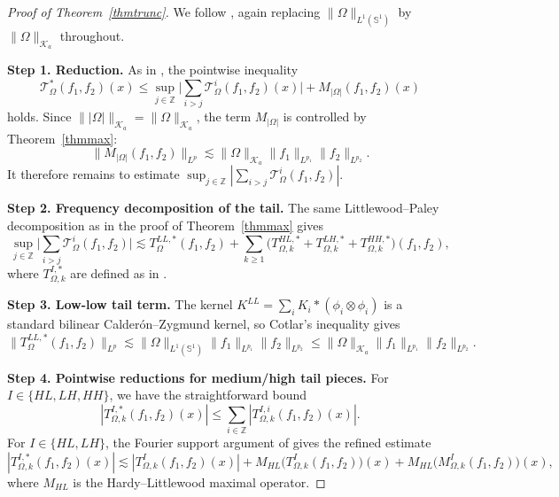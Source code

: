 \documentclass[11pt]{amsart}
\begin{document}
\begin{proof}[Proof of Theorem~\ref{thmtrunc}]
	We follow \cite[Section~8 and Theorem~1.5]{bhojak2025alternate}, again
	replacing $\|\Omega\|_{L^1(\mathbb S^1)}$ by $\|\Omega\|_{\mathcal K_a}$
	throughout.
	
	\medskip
	\noindent
	\textbf{Step 1. Reduction.}
	As in \cite[Section~8]{bhojak2025alternate}, the pointwise inequality
	\[
	\mathcal{T}_\Omega^*(f_1,f_2)(x)
	\le\sup_{j\in\mathbb Z}
	\Big|\sum_{i>j}\mathcal{T}_\Omega^i(f_1,f_2)(x)\Big|
	+M_{|\Omega|}(f_1,f_2)(x)
	\]
	holds. Since $\||\Omega|\|_{\mathcal K_a}=\|\Omega\|_{\mathcal K_a}$,
	the term $M_{|\Omega|}$ is controlled by Theorem~\ref{thmmax}:
	\[
	\|M_{|\Omega|}(f_1,f_2)\|_{L^p}
	\lesssim\|\Omega\|_{\mathcal K_a}
	\|f_1\|_{L^{p_1}}\|f_2\|_{L^{p_2}}.
	\]
	It therefore remains to estimate
	$\sup_{j\in\mathbb Z}|\sum_{i>j}\mathcal{T}_\Omega^i(f_1,f_2)|$.
	
	\medskip
	\noindent
	\textbf{Step 2. Frequency decomposition of the tail.}
	The same Littlewood--Paley decomposition as in the proof of
	Theorem~\ref{thmmax} gives
	\[
	\sup_{j\in\mathbb Z}
	\Big|\sum_{i>j}\mathcal{T}_\Omega^i(f_1,f_2)\Big|
	\lesssim T_\Omega^{LL,*}(f_1,f_2)
	+\sum_{k\ge 1}\bigl(T_{\Omega,k}^{HL,*}
	+T_{\Omega,k}^{LH,*}+T_{\Omega,k}^{HH,*}\bigr)(f_1,f_2),
	\]
	where $T_{\Omega,k}^{I,*}$ are defined as in
	\cite[Section~8]{bhojak2025alternate}.
	
	\medskip
	\noindent
	\textbf{Step 3. Low-low tail term.}
	The kernel $K^{LL}=\sum_i K_i*(\phi_i\otimes\phi_i)$ is a standard
	bilinear Calder\'on--Zygmund kernel, so Cotlar's inequality gives
	\[
	\|T_\Omega^{LL,*}(f_1,f_2)\|_{L^p}
	\lesssim\|\Omega\|_{L^1(\mathbb S^1)}
	\|f_1\|_{L^{p_1}}\|f_2\|_{L^{p_2}}
	\le\|\Omega\|_{\mathcal K_a}
	\|f_1\|_{L^{p_1}}\|f_2\|_{L^{p_2}}.
	\]
	
	\medskip
	\noindent
	\textbf{Step 4. Pointwise reductions for medium/high tail pieces.}
	For $I\in\{HL,LH,HH\}$, we have the straightforward bound
	\begin{equation}\label{eqtail-pointwise-1}
		|T_{\Omega,k}^{I,*}(f_1,f_2)(x)|
		\le\sum_{i\in\mathbb Z}|T_{\Omega,k}^{I,i}(f_1,f_2)(x)|.
	\end{equation}
	For $I\in\{HL,LH\}$, the Fourier support argument of
	\cite[pp.~22--23]{bhojak2025alternate} gives the refined estimate
	\begin{equation}\label{eqtail-pointwise-2}
		|T_{\Omega,k}^{I,*}(f_1,f_2)(x)|
		\lesssim|T_{\Omega,k}^I(f_1,f_2)(x)|
		+M_{HL}\bigl(T_{\Omega,k}^I(f_1,f_2)\bigr)(x)
		+M_{HL}\bigl(M_{\Omega,k}^I(f_1,f_2)\bigr)(x),
	\end{equation}
	where $M_{HL}$ is the Hardy--Littlewood maximal operator.
	

\end{proof}
\end{document}
